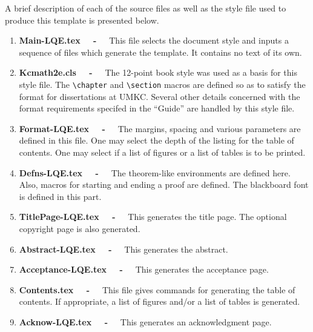 \clearpage


     A brief description of each of the source files as well as
the style file used to produce this template is  presented below.  

   

\def\filenameheading#1{%
\item {\bf #1 ~~-~~}}  

\begin{enumerate}
\filenameheading{Main-LQE.tex}
This file selects the document style  
and inputs a sequence of files which 
generate the template.  It contains no text of its own.  


\filenameheading{Kcmath2e.cls}
The 12-point book style was used as a basis for this style file.
The \verb+\chapter+ 
and \verb+\section+  macros  are defined so as to satisfy the 
format for dissertations at UMKC\@. Several other details 
concerned with the format requirements specifed 
in the ``Guide''
are handled by this style file.


\filenameheading{Format-LQE.tex}
The margins, spacing and various parameters are defined in this file. 
One may select the depth of the listing for the
table of contents.  One may select if a list of figures or 
a list of tables is to be printed.


\filenameheading{Defns-LQE.tex}
The theorem-like environments are defined here.
Also, macros for starting and ending a proof are defined.  
The blackboard font is defined in this part.



\filenameheading{TitlePage-LQE.tex}
This generates the title page.  
The optional copyright page is also generated.


\filenameheading{Abstract-LQE.tex}
This generates the abstract. 


\filenameheading{Acceptance-LQE.tex}
This generates the acceptance page.  


\filenameheading{Contents.tex}
This file gives commands for generating the table of contents.
If appropriate, a list of figures and/or a list of tables 
is generated. 


\filenameheading{Acknow-LQE.tex}
This generates an acknowledgment page.



\end{enumerate}
